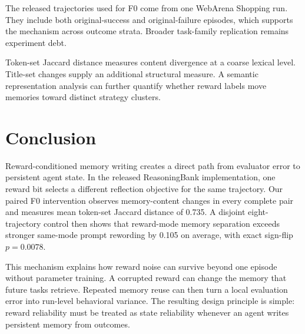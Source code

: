 The released trajectories used for F0 come from one WebArena Shopping run. They include both original-success and original-failure episodes, which supports the mechanism across outcome strata. Broader task-family replication remains experiment debt.

Token-set Jaccard distance measures content divergence at a coarse lexical level. Title-set changes supply an additional structural measure. A semantic representation analysis can further quantify whether reward labels move memories toward distinct strategy clusters.

\section{Conclusion}
Reward-conditioned memory writing creates a direct path from evaluator error to persistent agent state. In the released ReasoningBank implementation, one reward bit selects a different reflection objective for the same trajectory. Our paired F0 intervention observes memory-content changes in every complete pair and measures mean token-set Jaccard distance of 0.735. A disjoint eight-trajectory control then shows that reward-mode memory separation exceeds stronger same-mode prompt rewording by 0.105 on average, with exact sign-flip $p=0.0078$.

This mechanism explains how reward noise can survive beyond one episode without parameter training. A corrupted reward can change the memory that future tasks retrieve. Repeated memory reuse can then turn a local evaluation error into run-level behavioral variance. The resulting design principle is simple: reward reliability must be treated as state reliability whenever an agent writes persistent memory from outcomes.
